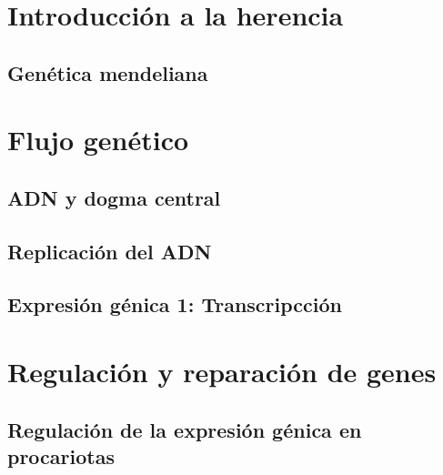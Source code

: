 \documentclass{AsignaturaResumen}
\begin{document}
    \frontmatter
    
\Portada    
\Indices

    \mainmatter


\part{Introducción a la herencia}

    \chapter{Genética mendeliana} 

\part{Flujo genético}

    \chapter{ADN y dogma central} 
    \chapter{Replicación del ADN} 
    \chapter{Expresión génica 1: Transcripcción} 

\part{Regulación y reparación de genes}

    \chapter{Regulación de la expresión génica en procariotas} 
\end{document}
